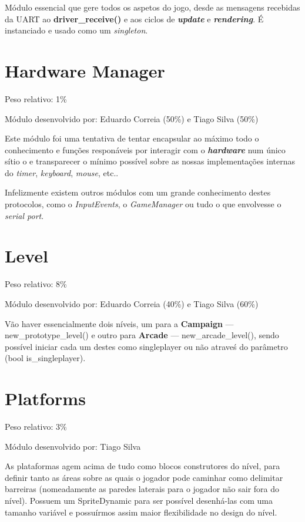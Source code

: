 \documentclass{report}
\begin{document}
Módulo essencial que gere todos os aspetos do jogo, desde as mensagens recebidas da UART ao \textbf{driver\_receive()} e aos ciclos de \textbf{\textit{update}} e \textbf{\textit{rendering}}. É instanciado e usado como um \textit{singleton}.

\section{Hardware Manager}

Peso relativo: 1\%

Módulo desenvolvido por: Eduardo Correia (50\%) e Tiago Silva (50\%)
\newline

Este módulo foi uma tentativa de tentar encapsular ao máximo todo o conhecimento e funções responáveis por interagir com o \textbf{\textit{hardware}} num único sítio o e transparecer o mínimo possível sobre as nossas implementações internas do \textit{timer}, \textit{keyboard}, \textit{mouse}, etc..

Infelizmente existem outros módulos com um grande conhecimento destes protocolos, como o \textit{InputEvents}, o \textit{GameManager} ou tudo o que envolvesse o \textit{serial port}.

\section{Level}

Peso relativo: 8\%

Módulo desenvolvido por: Eduardo Correia (40\%) e Tiago Silva (60\%) 
\newline

Vão haver essencialmente dois níveis, um para a \textbf{Campaign} --- new\_prototype\_level() e outro para \textbf{Arcade} --- new\_arcade\_level(), sendo possível iniciar cada um destes como singleplayer ou não atraveś do parâmetro (bool is\_singleplayer).

\section{Platforms}

Peso relativo: 3\%

Módulo desenvolvido por: Tiago Silva
\newline

As plataformas agem acima de tudo como blocos construtores do nível, para definir tanto as áreas sobre as quais o jogador pode caminhar como delimitar barreiras (nomeadamente as paredes laterais para o jogador não sair fora do nível).
Possuem um SpriteDynamic para ser possível desenhá-las com uma tamanho variável e possuírmos assim maior flexibilidade no design do nível.
\end{document}
